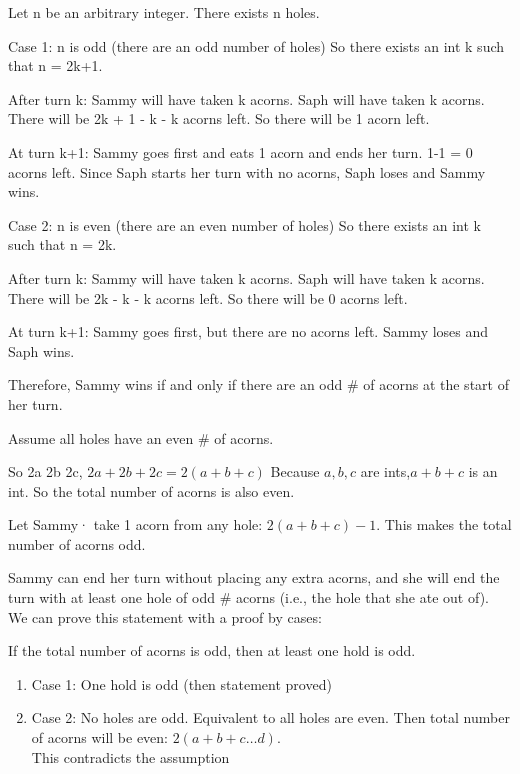 \documentclass[12pt]{exam}
\begin{document}
\begin{solution}
\begin{qparts}
    \item 
    Let n be an arbitrary integer. There exists n holes.

Case 1: n is odd (there are an odd number of holes)
So there exists an int k such that n = 2k+1.

After turn k:
Sammy will have taken k acorns.
Saph will have taken k acorns.
There will be 2k + 1 - k - k acorns left.
So there will be 1 acorn left.

At turn k+1:
Sammy goes first and eats 1 acorn and ends her turn.
1-1 = 0 acorns left.
Since Saph starts her turn with no acorns, Saph loses and Sammy wins.

Case 2: n is even (there are an even number of holes)
So there exists an int k such that n = 2k.

After turn k:
Sammy will have taken k acorns.
Saph will have taken k acorns.
There will be 2k - k - k acorns left.
So there will be 0 acorns left.

At turn k+1:
Sammy goes first, but there are no acorns left. Sammy loses and Saph wins.

Therefore, Sammy wins if and only if there are an odd \# of acorns at the start of her turn.

\item 
Assume all holes have an even \# of acorns.

So 2a 2b 2c, $2a + 2b + 2c = 2(a+b+c)$
Because $a,b, c$ are ints,$ a+b+c$ is an int. So the total number of acorns is also even.

Let Sammy· take 1 acorn from any hole:
$2(a+b+c) - 1$.
This makes the total number of acorns odd.

Sammy can end her turn without placing any extra acorns, and she will end the turn with at least one hole of odd \# acorns (i.e., the hole that she ate out of). We can prove this statement with a proof by cases: 

If the total number of acorns is odd, then at least one hold is odd.
\begin{enumerate}
    \item Case 1: One hold is odd (then statement proved)
    \item Case 2: No holes are odd. Equivalent to all holes are even. Then total number of acorns will be even: $2(a+b+c…d)$.\\
    This contradicts the assumption
\end{enumerate}


\end{qparts}
\end{solution}
\end{document}
